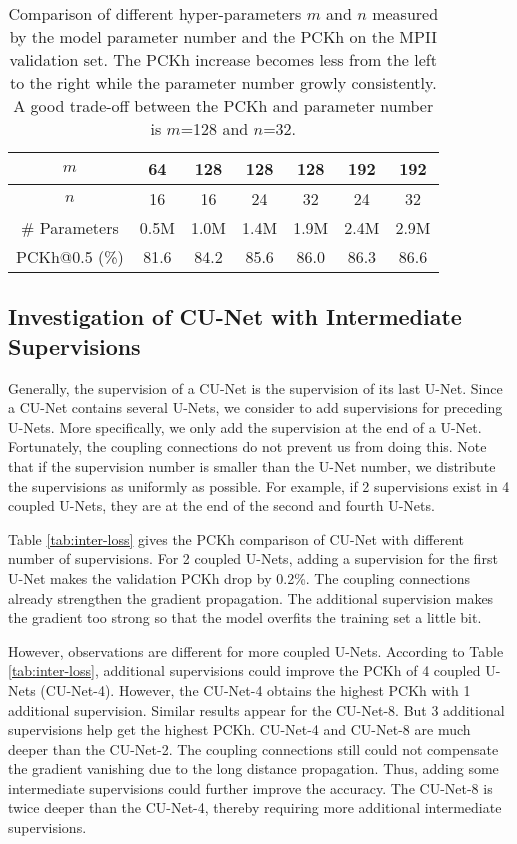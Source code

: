 \documentclass{bmvc2k}
\begin{document}
\begin{table}[t!]
\begin{center}
\caption{Comparison of different hyper-parameters $m$ and $n$ measured by the model parameter number and the PCKh on the MPII validation set. The PCKh increase becomes less from the left to the right while the parameter number growly consistently. A good trade-off between the PCKh and parameter number is $m$=128 and $n$=32.}\label{tb:mn-para}
\begin{tabular}{c|cccccc}
\toprule
$m$ & 64 & 128 & 128 & 128 & 192 & 192\\
\hline
$n$ & 16 & 16 & 24 & 32 & 24 & 32\\
\hline
\# Parameters & 0.5M & 1.0M & 1.4M & 1.9M & 2.4M  & 2.9M\\
\hline
PCKh@0.5 (\%) & 81.6 & 84.2 & 85.6 & 86.0 & 86.3 & 86.6\\
\bottomrule
\end{tabular}  
\end{center}
\end{table}

\subsection{Investigation of CU-Net with Intermediate Supervisions}
Generally, the supervision of a CU-Net is the supervision of its last U-Net. Since a CU-Net  contains several U-Nets, we consider to add supervisions for preceding U-Nets. More specifically, we only add the supervision at the end of a U-Net. Fortunately, the coupling connections do not prevent us from doing this. Note that if the supervision number is smaller than the U-Net number, we distribute the supervisions as uniformly as possible. For example, if 2 supervisions exist in 4 coupled U-Nets, they are at the end of the second and fourth U-Nets. 

Table \ref{tab:inter-loss} gives the PCKh comparison of CU-Net with different number of supervisions. For 2 coupled U-Nets, adding a supervision for the first U-Net makes the validation PCKh drop by 0.2\%. The coupling connections already strengthen the gradient propagation. The additional supervision makes the gradient too strong so that the model overfits the training set a little bit.

However, observations are different for more coupled U-Nets. According to Table \ref{tab:inter-loss}, additional supervisions could improve the PCKh of 4 coupled U-Nets (CU-Net-4). However, the CU-Net-4 obtains the highest PCKh with 1 additional supervision. Similar results appear for the CU-Net-8. But 3 additional supervisions help get the highest PCKh. CU-Net-4 and CU-Net-8 are much deeper than the CU-Net-2. The coupling connections still could not compensate the gradient vanishing due to the long distance propagation. Thus, adding some intermediate supervisions could further improve the accuracy. The CU-Net-8 is twice deeper than the CU-Net-4, thereby requiring more additional intermediate supervisions.
\end{document}
